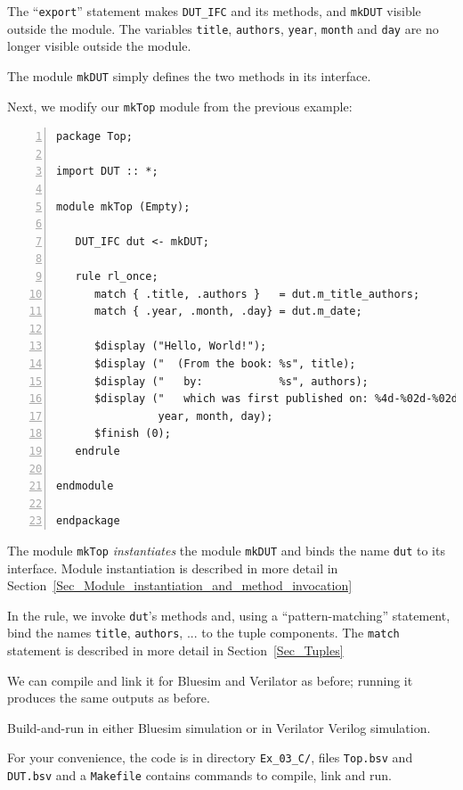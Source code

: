 The ``\verb|export|'' statement makes \verb|DUT_IFC| and its methods,
and \verb|mkDUT| visible outside the module.  The variables
\verb|title|, \verb|authors|, \verb|year|, \verb|month| and \verb|day|
are no longer visible outside the module.

The module \verb|mkDUT| simply defines the two methods in its interface.

Next, we modify our \verb|mkTop| module from the previous example:

{\small
\begin{Verbatim}[frame=single, numbers=left, label=in file Ex\_04\_04/Top.bsv]
package Top;

import DUT :: *;

module mkTop (Empty);

   DUT_IFC dut <- mkDUT;

   rule rl_once;
      match { .title, .authors }   = dut.m_title_authors;
      match { .year, .month, .day} = dut.m_date;

      $display ("Hello, World!");
      $display ("  (From the book: %s", title);
      $display ("   by:            %s", authors);
      $display ("   which was first published on: %4d-%02d-%02d)",
                year, month, day);
      $finish (0);
   endrule

endmodule

endpackage
\end{Verbatim}
}

The module \verb|mkTop| \emph{instantiates} the module \verb|mkDUT|
and binds the name \verb|dut| to its interface.  Module instantiation
is described in more detail in
Section~\ref{Sec_Module_instantiation_and_method_invocation}

In the rule, we invoke \verb|dut|'s methods and, using a
``pattern-matching'' statement, bind the names \verb|title|,
\verb|authors|, ... {\etc} to the tuple components. The \verb|match|
statement is described in more detail in Section~\ref{Sec_Tuples}

We can compile and link it for Bluesim and Verilator as before;
running it produces the same outputs as before.

\Beginexercise

\Exercise

Build-and-run in either Bluesim simulation or in Verilator Verilog
simulation.

For your convenience, the code is in directory \verb|Ex_03_C/|, files
\verb|Top.bsv| and \verb|DUT.bsv| and a \verb|Makefile| contains
commands to compile, link and run.

